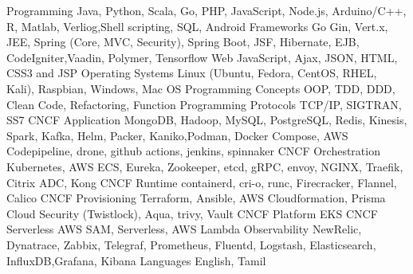 


\begin{cvskills}


\cvskill
{Programming} %
{Java, Python, Scala, Go, PHP, JavaScript, Node.js, Arduino/C++, R, Matlab, Verliog,\newline Shell scripting, SQL, Android} %
\cvskill
{Frameworks} %
{Go Gin, Vert.x, JEE, Spring (Core, MVC, Security), Spring Boot, JSF, Hibernate, EJB, CodeIgniter,\newline Vaadin, Polymer, Tensorflow} %
\cvskill
{Web} %
{JavaScript, Ajax, JSON, HTML, CSS3 and JSP} %
\cvskill
{Operating Systems} %
{Linux (Ubuntu, Fedora, CentOS, RHEL, Kali), Raspbian, Windows, Mac OS} %
\cvskill
{Programming Concepts} %
{OOP, TDD, DDD, Clean Code, Refactoring, Function Programming} %
\cvskill
{Protocols} %
{TCP/IP, SIGTRAN, SS7} %
\cvskill
{CNCF Application} %
{MongoDB, Hadoop, MySQL, PostgreSQL, Redis, Kinesis, Spark, Kafka, Helm, Packer, Kaniko,\newline Podman, Docker Compose, AWS Codepipeline, drone, github actions, jenkins, spinnaker} %
\cvskill
{CNCF Orchestration} %
{Kubernetes, AWS ECS, Eureka, Zookeeper, etcd, gRPC, envoy, NGINX, Traefik, Citrix ADC, Kong} %
\cvskill
{CNCF Runtime} %
{containerd, cri-o, runc, Firecracker, Flannel, Calico} %
\cvskill
{CNCF Provisioning} %
{Terraform, Ansible, AWS Cloudformation, Prisma Cloud Security (Twistlock), Aqua, trivy, Vault} %
\cvskill
{CNCF Platform} %
{EKS} %
\cvskill
{CNCF Serverless} %
{AWS SAM, Serverless, AWS Lambda} %
\cvskill
{Observability} %
{NewRelic, Dynatrace, Zabbix, Telegraf, Prometheus, Fluentd, Logstash, Elasticsearch, InfluxDB,\newline Grafana, Kibana} %
\cvskill
{Languages} %
{English, Tamil} %

\end{cvskills}